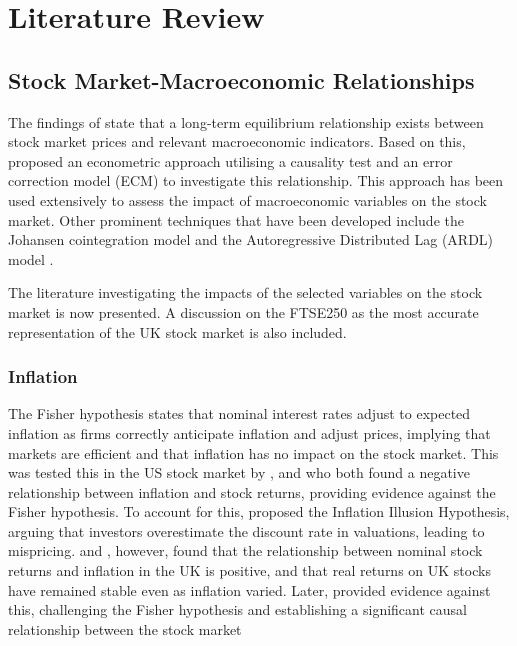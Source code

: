 \documentclass[11pt,a4paper]{article}
\newcommand{\citeboth}[1]{\citeauthor{#1} \citep{#1}}
\begin{document}
\section{Literature Review}

\subsection{Stock Market-Macroeconomic Relationships}

The findings of \citeboth{ChenRollRoss1986} state that a long-term equilibrium relationship 
exists between stock market prices and relevant macroeconomic indicators. Based on this, 
\citeboth{EngleGranger1987} proposed an econometric approach utilising a causality test and an 
error correction model (ECM) to investigate this relationship. This approach has been used extensively \citep{QuadriMasih, Plíhal2016,olomu2015} to assess the impact of macroeconomic variables on the stock market. 
Other prominent techniques that have been developed include the Johansen cointegration model \citep{YadavKheraMishra2021,Ozcan2012,ChistiShakeelGanai2020} and the Autoregressive Distributed Lag (ARDL) model \citep{khan2018,demir2019,neifar2023}.

The literature investigating the impacts of the selected variables on the stock market is now presented. A discussion on the FTSE250 as the most accurate representation of the UK stock market is also included.

\subsubsection{Inflation}

The Fisher hypothesis states that nominal interest rates adjust to expected 
inflation as firms correctly anticipate inflation 
and adjust prices, implying that markets are efficient and that inflation has no impact on the stock market. This was tested this in the US stock market by \citeboth{jaffe1976}, and
\citeboth{bodie1976} who both found a negative relationship between inflation and stock returns, providing evidence against the Fisher hypothesis.
To account for this,
\citeboth{mogdiliani1979} proposed the Inflation Illusion Hypothesis, 
arguing that investors overestimate the discount rate in valuations, leading to mispricing. 
\citeboth{gultekin1983} and \citeboth{firth1979}, however, found that the relationship between nominal stock returns and inflation in the UK is positive, and that real returns on UK stocks have remained stable even as inflation varied.
Later, \citeboth{hasan2008} provided evidence against this, challenging the Fisher hypothesis and establishing a 
significant causal relationship between the stock market 
\end{document}
